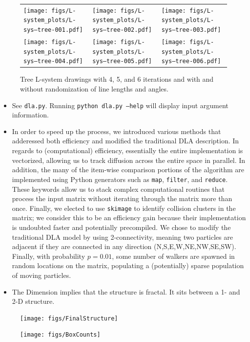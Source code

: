 \documentclass[11pt, oneside]{article}   	%
\begin{document}
	\hspace{-2mm}\begin{figure}[h!]
		\centering
		\vspace{-3mm}
		\hspace{-6mm}\begin{tabular}{lll}
			\texttt{[image: figs/L-system\_plots/L-sys--tree-001.pdf]}
			&			\hspace{-9mm}
			\texttt{[image: figs/L-system\_plots/L-sys--tree-002.pdf]}
			&			\hspace{-9mm}
			\texttt{[image: figs/L-system\_plots/L-sys--tree-003.pdf]}
			\\
			\texttt{[image: figs/L-system\_plots/L-sys--tree-004.pdf]}
			&			\hspace{-9mm}
			\texttt{[image: figs/L-system\_plots/L-sys--tree-005.pdf]}
			&			\hspace{-9mm}
			\texttt{[image: figs/L-system\_plots/L-sys--tree-006.pdf]}
		\end{tabular}
		\vspace{-3mm}\caption{Tree L-system drawings with 4, 5, and 6 iterations and with and without randomization of line lengths and angles.}
		\label{tree_plots}
	\end{figure}


	\begin{itemize}
	\item See \texttt{dla.py}. Running \texttt{python dla.py --help} will display input argument
	information.
	\item In order to speed up the process, we introduced various methods that adderessed both
	efficiency and modified the traditional DLA description. In regards to (computational) efficiency, essentially
	the entire implementation is vectorized, allowing us to track diffusion across the entire space in parallel.
	In addition, the many of the item-wise comparison portions of the algorithm are implemented using Python generators such as \texttt{map}, \texttt{filter}, and \texttt{reduce}.
	These keywords allow us to stack complex computational routines that process the input matrix without iterating through the matrix more than once. Finally, we elected to use \texttt{skimage} to identify collision clusters in the matrix; we consider this to be an efficiency gain because their implementation is undoubted faster and potentially precompiled. We chose to modify the traditional DLA model by using 2-connectivity, meaning two particles are adjacent if they are connected in any direction (N,S,E,W,NE,NW,SE,SW). Finally, with probability $p=0.01$, some number of walkers are spawned in random locations on the matrix, populating a (potentially) sparse population of moving particles.
	\item The Dimension implies that the structure is fractal. It sits between a 1- and 2-D structure.
	\end{itemize}
	\vspace{-5mm}
	\begin{figure}[h!]
		\centering
		\texttt{[image: figs/FinalStructure]}
	\end{figure}\vspace{-15mm}
	\begin{figure}[h!]
		\centering
		\texttt{[image: figs/BoxCounts]}
	\end{figure}
\end{document}
